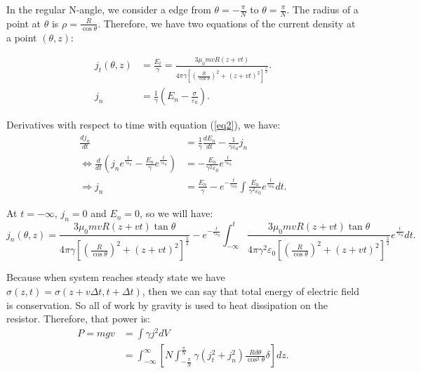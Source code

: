 \documentclass[12pt]{article}
\begin{document}
\noindent In the regular N-angle, we consider a edge from $\theta=-\frac{\pi}{N}$ to $\theta=\frac{\pi}{N}$. The radius of a point at $\theta$ is $\rho = \frac{R}{\cos \theta}$. Therefore, we have two equations of the current density at a point $(\theta, z)$:

\begin{align}
    j_t (\theta,z) & = \frac{E_t}{\gamma} = \frac{3 \mu_0 m v R \left( z + vt \right) }{4 \pi \gamma \left[ \left( \frac{R}{\cos \theta} \right)^2 + \left( z + vt \right)^2 \right]^{\frac{5}{2}} } . \label{eq1} \\
	j_n & = \frac{1}{\gamma} \left( E_n - \frac{\sigma}{\varepsilon_0} \right) . \label{eq2}
\end{align}	
	
\noindent Derivatives with respect to time with equation (\ref{eq2}), we have:
\begin{align*}
	\frac{ d j_n }{dt} & = \frac{1}{\gamma} \frac{d E_n}{dt} - \frac{1}{\gamma \varepsilon_0} j_n \\
	\Leftrightarrow \frac{d}{dt} \left( j_n e^{\frac{t}{\gamma \varepsilon_0}} - \frac{E_n}{\gamma} e^{\frac{t}{\gamma \varepsilon_0}} \right) & = - \frac{E_n}{\gamma^2 \varepsilon_0} e^{\frac{t}{\gamma \varepsilon_0}} \\
	\Rightarrow j_n & = \frac{E_n}{\gamma} - e^{-\frac{t}{\gamma \varepsilon_0}} \int \frac{E_n}{\gamma^2 \varepsilon_0} e^{\frac{t}{\gamma \varepsilon_0}} dt .
\end{align*}	

\noindent At $t = - \infty$, $j_n = 0$ and $E_n = 0$, so we will have: 
$$ j_n (\theta,z) = \frac{3 \mu_0 m v R \left( z + vt \right) \tan \theta }{4 \pi \gamma \left[ \left( \frac{R}{\cos \theta} \right)^2 + \left( z + vt \right)^2 \right]^{\frac{5}{2}} } - e^{-\frac{t}{\gamma \varepsilon_0}} \int_{-\infty}^t \frac{3 \mu_0 m v R \left( z + vt \right) \tan \theta }{4 \pi \gamma^2 \varepsilon_0 \left[ \left( \frac{R}{\cos \theta} \right)^2 + \left( z + vt \right)^2 \right]^{\frac{5}{2}} } e^{\frac{t}{\gamma \varepsilon_0}} dt .$$

\noindent Because when system reaches steady state we have $ \sigma(z,t) = \sigma (z + v \Delta t, t + \Delta t)$, then we can say that total energy of electric field is conservation. So all of work by gravity is used to heat dissipation on the resistor. Therefore, that power is:
\begin{align*}
	 P = mgv & = \int \gamma j^2 dV \\
	 & = \int_{-\infty}^{\infty} \left[ N \int_{-\frac{\pi}{N}}^{\frac{\pi}{N}} \gamma \left( j_t^2 + j_n^2 \right) \frac{R d \theta}{\cos^2 \theta} \delta \right] dz .
\end{align*} 
\end{document}

